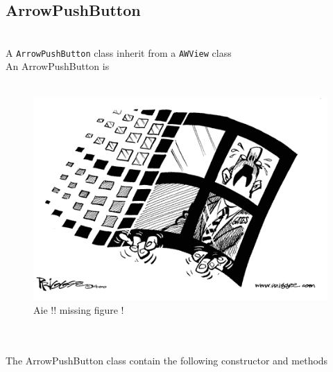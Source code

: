 \documentclass[a4paper,11pt]{extarticle}
\begin{document}
\newpage
\subsection{ArrowPushButton}

~\\ A \texttt{ArrowPushButton} class inherit from a \texttt{AWView} class
~\\ An ArrowPushButton is 
~\\
~\\

\begin{figure}[htbp]
   \centering
   \includegraphics[scale=0.55]{AWFig.png} 
   \caption{Aie !! missing figure !}
   \label{fig:16 }
\end{figure}

~\\

~\\ The ArrowPushButton class contain the following constructor and methods
\end{document}
